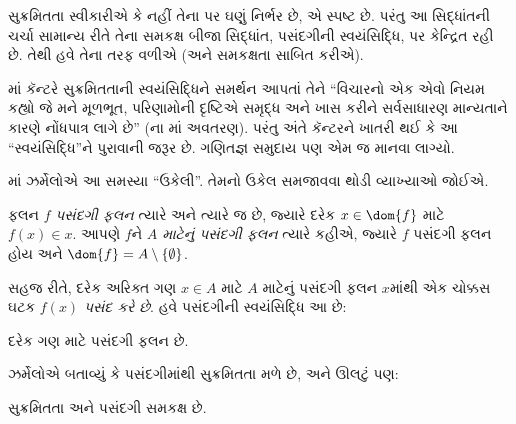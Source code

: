 \documentclass[../../../include/open-logic-section]{subfiles}
\begin{document}

સુક્રમિતતા સ્વીકારીએ કે નહીં તેના પર ઘણું
નિર્ભર છે, એ સ્પષ્ટ છે. પરંતુ આ સિદ્ધાંતની
ચર્ચા સામાન્ય રીતે તેના સમકક્ષ બીજા સિદ્ધાંત,
પસંદગીની સ્વયંસિદ્ધિ, પર કેન્દ્રિત રહી છે.
તેથી હવે તેના તરફ વળીએ (અને સમકક્ષતા
સાબિત કરીએ).

\citeyear{Cantor1883}માં કૅન્ટરે સુક્રમિતતાની
સ્વયંસિદ્ધિને સમર્થન આપતાં તેને ``વિચારનો
એક એવો નિયમ કહ્યો જે મને મૂળભૂત,
પરિણામોની દૃષ્ટિએ સમૃદ્ધ અને ખાસ કરીને
સર્વસાધારણ માન્યતાને કારણે નોંધપાત્ર લાગે છે''
(\citeauthor{Potter2004}ના
\citeyear[p.~243]{Potter2004}માં અવતરણ).
પરંતુ અંતે કૅન્ટરને ખાતરી થઈ કે આ
``સ્વયંસિદ્ધિ''ને પુરાવાની જરૂર છે.
ગણિતજ્ઞ સમુદાય પણ એમ જ માનવા લાગ્યો.

\citeyear{Zermelo1904}માં ઝર્મેલોએ આ
સમસ્યા ``ઉકેલી''. તેમનો ઉકેલ સમજાવવા
થોડી વ્યાખ્યાઓ જોઈએ.

\begin{defn}
ફલન $f$ \emph{પસંદગી ફલન} ત્યારે અને
ત્યારે જ છે, જ્યારે દરેક $x \in \dom{f}$
માટે $f(x) \in x$. આપણે $f$ને
\emph{$A$ માટેનું પસંદગી ફલન} ત્યારે કહીએ,
જ્યારે $f$ પસંદગી ફલન હોય અને
$\dom{f} = A \setminus \{\emptyset\}$.
\end{defn}

સહજ રીતે, દરેક અરિક્ત ગણ $x \in A$ માટે
$A$ માટેનું પસંદગી ફલન $x$માંથી એક ચોક્કસ ઘટક
$f(x)$ \emph{પસંદ કરે છે}. હવે પસંદગીની
સ્વયંસિદ્ધિ આ છે:

\begin{axiom}[પસંદગી]
	દરેક ગણ માટે પસંદગી ફલન છે.
\end{axiom}

ઝર્મેલોએ બતાવ્યું કે પસંદગીમાંથી સુક્રમિતતા
મળે છે, અને ઊલટું પણ:

\begin{thm}[$\ZF$માં]
સુક્રમિતતા અને પસંદગી સમકક્ષ છે.
\end{thm}
\end{document}
